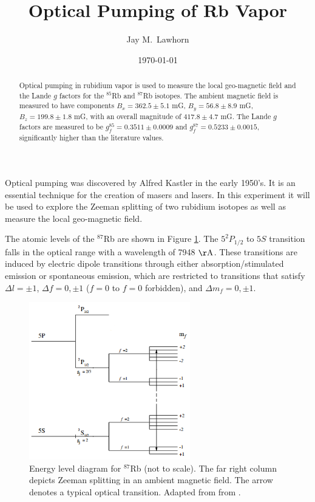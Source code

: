 \newcommand{\cd}{$\cdot$}

%
%


\title{Optical Pumping of Rb Vapor}
\author{Jay M.\ Lawhorn}
\date{\today}

\begin{abstract}
Optical pumping in rubidium vapor is used to measure the local geo-magnetic field and the Lande $g$ factors for the $^{85}$Rb and $^{87}$Rb isotopes. The ambient magnetic field is measured to have components $B_x=362.5\pm5.1$ mG, $B_y=56.8\pm8.9$ mG, $B_z=199.8\pm1.8$ mG, with an overall magnitude of $417.8\pm4.7$ mG. The Lande $g$ factors are measured to be $g_{f}^{85} = 0.3511\pm0.0009$ and 
$g_{f}^{87} = 0.5233\pm0.0015,$ significantly higher than the literature values. 
\end{abstract}

\maketitle


Optical pumping was discovered by Alfred Kastler in the early 1950's. It is an essential technique for the creation of masers and lasers. In this experiment it will be used to explore the Zeeman splitting of two rubidium isotopes as well as measure the local geo-magnetic field.

The atomic levels of the $^{87}$Rb are shown in Figure \ref{rb87}. The $5^{2}P_{1/2}$ to $5S$ transition falls in the optical range with a wavelength of 7948 $\mathrm{\AA}$. These transitions are induced by electric dipole transitions through either absorption/stimulated emission or spontaneous emission, which are restricted to transitions that satisfy $\Delta l = \pm 1$, $\Delta f = 0, \pm1$ ($f=0$ to $f=0$ forbidden), and $\Delta m_f = 0,\pm1$. 
\begin{figure}[htb]
\includegraphics[width=7cm]{rb87.png}
\caption{Energy level diagram for $^{87}$Rb (not to scale). The far right column depicts Zeeman splitting in an ambient magnetic field. The arrow denotes a typical optical transition. Adapted from from \cite{lab}. }
\label{rb87}
\end{figure}

